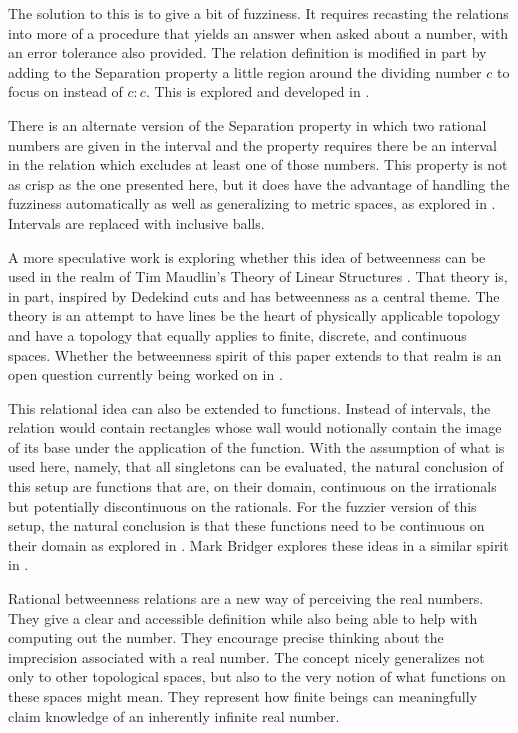 \documentclass[12pt]{article}
\begin{document}
The solution to this is to give a bit of fuzziness. It requires recasting the relations into more of a procedure that yields an answer when asked about a number, with an error tolerance also provided. The relation definition is modified in part by adding to the Separation property a little region around the dividing number $c$ to focus on instead of $c:c$. This is explored and developed in \cite{taylor24oraclerbr}.

There is an alternate version of the Separation property in which two rational numbers are given in the interval and the property requires there be an interval in the relation which excludes at least one of those numbers. This property is not as crisp as the one presented here, but it does have the advantage of handling the fuzziness automatically as well as generalizing to metric spaces, as explored in \cite{taylor23metric}. Intervals are replaced with inclusive balls. 

A more speculative work is exploring whether this idea of betweenness can be used in the realm of Tim Maudlin's Theory of Linear Structures \cite{maudlin}. That theory is, in part, inspired by Dedekind cuts and has betweenness as a central theme. The theory is an attempt to have lines be the heart of physically applicable topology and have a topology that equally applies to finite, discrete, and continuous spaces. Whether the betweenness spirit of this paper extends to that realm is an open question currently being worked on in \cite{taylor23maudlin}.

This relational idea can also be extended to functions. Instead of intervals, the relation would contain rectangles whose wall would notionally contain the image of its base under the application of the function. With the assumption of what is used here, namely, that all singletons can be evaluated, the natural conclusion of this setup are functions that are, on their domain, continuous on the irrationals but potentially discontinuous on the rationals. For the fuzzier version of this setup, the natural conclusion is that these functions need to be continuous on their domain as explored in \cite{taylor23main}. Mark Bridger explores  these ideas in a similar spirit in \cite{bridger}.

Rational betweenness relations are a new way of perceiving the real numbers. They give a clear and accessible definition while also being able to help with computing out the number. They encourage precise thinking about the imprecision associated with a real number. The concept nicely generalizes not only to other topological spaces, but also to the very notion of what functions on these spaces might mean. They represent how finite beings can meaningfully claim knowledge of an inherently infinite real number. 


\medskip

\normalem %
\printbibliography
\end{document}
